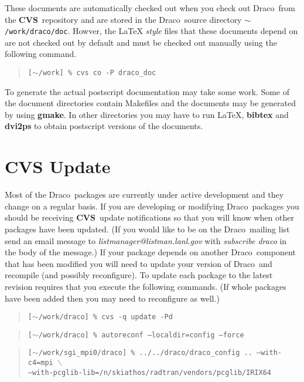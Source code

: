 \documentclass[10pt]{nmemo}
\newcommand{\comp}[1]{\normalfont\normalsize\texttt{#1}}
\newcommand{\draco}{{\normalfont\sffamily Draco}}
\newcommand{\cvs}{{\normalfont\bfseries CVS}}
\begin{document}
These documents are automatically checked out when you check out
\draco\ from the \cvs\ repository and are stored in the \draco\ source
directory \comp{$\sim$/work/draco/doc}.  Howver, the \LaTeX
\emph{style} files that these documents depend on are not checked out
by default and must be checked out manually using the following
command.

\footnotesize
\begin{quote}
\texttt{[$\sim$/work] \% cvs co -P draco\_doc}
\end{quote}
\normalsize

To generate the actual postscript documentation may take some work.
Some of the document directories contain Makefiles and the documents
may be generated by using \textbf{gmake}.  In other directories you
may have to run \LaTeX, \textbf{bibtex} and \textbf{dvi2ps} to obtain
postscript versions of the documents.

\section{CVS Update}

Most of the \draco\ packages are currently under active development
and they change on a regular basis.  If you are developing or
modifying \draco\ packages you should be receiving \cvs\ update
notifications so that you will know when other packages have been
updated.  (If you would like to be on the \draco\ mailing list send an
email message to \emph{listmanager@listman.lanl.gov} with
\emph{subscribe draco} in the body of the message.)  If your package
depends on another \draco\ component that has been modified you will
need to update your version of \draco\ and recompile (and possibly
reconfigure).  To update each package to the latest revision requires
that you execute the following commands.  (If whole packages have been
added then you may need to reconfigure as well.)

\footnotesize
\begin{verse}
\texttt{[$\sim$/work/draco] \% cvs -q update -Pd}
\end{verse}

\begin{verse}
\texttt{[$\sim$/work/draco] \% autoreconf --localdir=config --force}
\end{verse}

\begin{verse}
\texttt{[$\sim$/work/sgi\_mpi0/draco] \% ../../draco/draco\_config
.. --with-c4=mpi $\backslash$ \\
\hspace{0.5in}--with-pcglib-lib=/n/skiathos/radtran/vendors/pcglib/IRIX64}
\end{verse}
\end{document}
